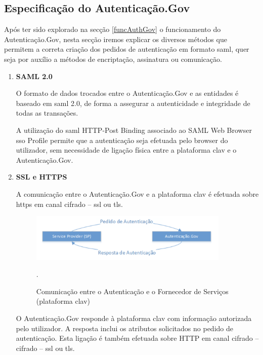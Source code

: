 \subsection{Especificação do Autenticação.Gov} \label{especificacaoAuthGov}

\vspace{-2mm}
Após ter sido explorado na secção \ref{funcAuthGov} o funcionamento do Autenticação.Gov, nesta secção iremos explicar os diversos métodos que permitem a correta criação dos pedidos de autenticação em formato \gls{saml}, quer seja por auxílio a métodos de encriptação, assinatura ou comunicação.

\begin{enumerate}
    \item \textbf{SAML 2.0}
    
    O formato de dados trocados entre o Autenticação.Gov e as entidades é baseado em \gls{saml} 2.0, de forma a assegurar a autenticidade e integridade de todas as transações.
    
    A utilização do \gls{saml} HTTP-Post Binding associado ao SAML Web Browser \gls{sso} Profile permite que a autenticação seja efetuada pelo browser do utilizador, sem necessidade de ligação física entre a plataforma \gls{clav} e o Autenticação.Gov.
    
    \item \textbf{SSL e HTTPS}
    
    A comunicação entre o Autenticação.Gov e a plataforma \gls{clav} é efetuada sobre \gls{https} em canal cifrado – \gls{ssl} ou \gls{tls}.
    
    \begin{figure}[ht!]
        \centering
        \includegraphics[width=0.9\textwidth]{img/saml/pedido.png}
        \caption{Comunicação entre o Autenticação e o Fornecedor de Serviços (plataforma \gls{clav})}.
    \end{figure}
  
  \cleardoublepage
    O Autenticação.Gov responde à plataforma \gls{clav} com informação autorizada pelo utilizador. A resposta inclui os atributos solicitados no pedido de autenticação. Esta ligação é também efetuada sobre HTTP em canal cifrado – cifrado – \gls{ssl} ou \gls{tls}.
    

\end{enumerate}
